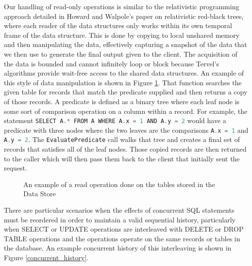 \documentclass[letter,11pt]{article}
\let\oldReturn\Return
\renewcommand{\Return}{\State\oldReturn}
\newcommand{\inlinecode}[1]{\colorbox{codegrey}{\lstinline[language=C++]{#1}}}
\begin{document}
\par\vspace{\baselineskip}
Our handling of read-only operations is similar to the relativistic programming approach detailed 
in Howard and Walpole's paper on relativistic red-black trees, where each reader of the 
data structures only works within its own temporal frame of the data structure\cite{rbtree}. 
This is done by copying to local unshared memory and then manipulating the data, 
effectively capturing a snapshot of the data that we then use to generate the final 
output given to the client. The acquisition of the data is bounded and cannot 
infinitely loop or block because Tervel's algorithms provide wait-free access 
to the shared data structures. An example of this style of data manipulation is shown in 
Figure \ref{read_op}. That function searches the given table for records that match
the predicate supplied and then returns a copy of those records. A predicate is defined
as a binary tree where each leaf node is some sort of comparison operation on a column
within a record. For example, the statement \inlinecode{SELECT A.* FROM A WHERE A.x = 1 AND A.y = 2}
would have a predicate with three nodes where the two leaves are the comparisons
\inlinecode{A.x = 1} and \inlinecode{A.y = 2}. The \inlinecode{EvaluatePredicate} call
walks that tree and creates a final set of records that satisfies all of the
leaf nodes. Those copied records are then returned to the caller which will then
pass them back to the client that initially sent the request.

\begin{figure}[h]
 \begin{algorithmic}
  \EndFor
 \Else
 \EndIf
 \EndFunction
 \end{algorithmic}
 \caption{An example of a read operation done on the tables stored in the Data Store}
 \label{read_op}
\end{figure}

\par\vspace{\baselineskip}
There are particular scenarios when the effects of concurrent SQL statements must be reordered
in order to maintain a valid sequential history, particularly when SELECT or UPDATE operations
are interleaved with DELETE or DROP TABLE operations and the operations operate on the same 
records or tables in the database. An example concurrent history of this interleaving is shown in 
Figure \ref{concurrent_history}.
\end{document}
